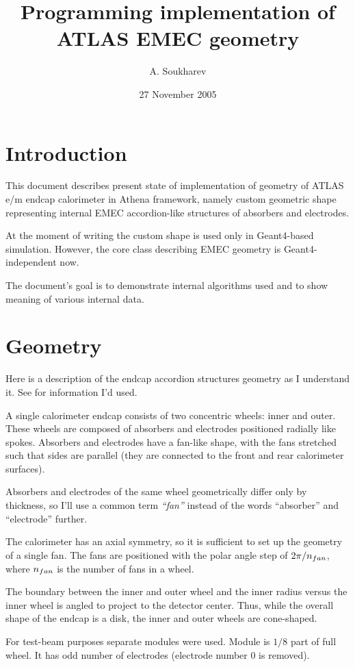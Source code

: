 \documentclass{article}
\author{A. Soukharev}
\title{Programming implementation of ATLAS EMEC geometry}
\date{27 November 2005}
\begin{document}
\maketitle
\section{Introduction}
This document describes present state of implementation of geometry of ATLAS e/m
endcap calorimeter in Athena framework, namely custom geometric shape
representing
internal EMEC accordion-like structures of absorbers and electrodes.

At the moment of writing the custom shape is used only in Geant4-based
simulation. However, the core class describing EMEC geometry is
Geant4-independent now.

The document's goal is to demonstrate internal algorithms used and
to show meaning of various internal data.

\section{Geometry}
Here is a description of the endcap accordion structures geometry as I
understand it. See \cite{r1, r2, r3, EMEC} for information I'd used.

A single calorimeter endcap consists of two concentric wheels: inner and
outer. These wheels are composed of absorbers and electrodes positioned radially
like spokes. Absorbers and electrodes have a fan-like shape, with the fans 
stretched such that sides are parallel (they are connected to the front and
rear calorimeter surfaces).

Absorbers and electrodes of the same wheel geometrically differ 
only by thickness, so I'll use a common term {\em ``\/fan''} instead
of the words ``absorber'' and ``electrode'' further.

The calorimeter has an axial symmetry, so it is sufficient to set up 
the geometry of a single fan. The fans are positioned with the polar
angle step of $2\pi / n_{fan}\/$, where $n_{fan}\/$ is the number of fans
in a wheel.

The boundary between the inner and outer wheel and the inner radius versus
the inner wheel is angled to
project to the detector center. Thus, while the overall shape of the
endcap is a
disk, the inner and outer wheels are cone-shaped.

For test-beam purposes separate modules were used. Module is $1/8$ part of full
wheel. It has odd number of electrodes (electrode number 0 is removed).
\end{document}
